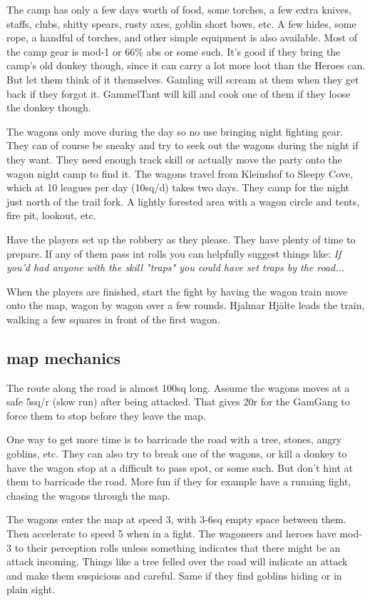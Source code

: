 The camp has only a few days worth of food, some torches, a few extra knives, staffs, clubs, shitty spears, rusty axes, goblin short bows, etc. A few hides, some rope, a handful of torches, and other simple equipment is also available. Most of the camp gear is mod-1 or 66\% abs or some such. It's good if they bring the camp's old donkey though, since it can carry a lot more loot than the Heroes can. But let them think of it themselves. Gamling will scream at them when they get back if they forgot it. GammelTant will kill and cook one of them if they loose the donkey though.

The wagons only move during the day so no use bringing night fighting gear. They can of course be sneaky and try to seek out the wagons during the night if they want. They need enough track skill or actually move the party onto the wagon night camp to find it. The wagons travel from Kleinshof to Sleepy Cove, which at 10 leagues per day (10sq/d) takes two days. They camp for the night just north of the trail fork. A lightly forested area with a wagon circle and tents, fire pit, lookout, etc.

Have the players set up the robbery as they please. They have plenty of time to prepare. If any of them pass int rolls you can helpfully suggest things like: \emph{If you'd had anyone with the skill "traps" you could have set traps by the road...}

When the players are finished, start the fight by having the wagon train move onto the map, wagon by wagon over a few rounds. Hjalmar Hjälte leads the train, walking a few squares in front of the first wagon.


\subsection*{map mechanics}

The route along the road is almost 100sq long. Assume the wagons moves at a safe 5sq/r (slow run) after being attacked. That gives 20r for the GamGang to force them to stop before they leave the map.

One way to get more time is to barricade the road with a tree, stones, angry goblins, etc. They can also try to break one of the wagons, or kill a donkey to have the wagon stop at a difficult to pass spot, or some such. But don't hint at them to barricade the road. More fun if they for example have a running fight, chasing the wagons through the map.

The wagons enter the map at speed 3, with 3-6sq empty space between them. Then accelerate to speed 5 when in a fight. The wagoneers and heroes have mod-3 to their perception rolls unless something indicates that there might be an attack incoming. Things like a tree felled over the road will indicate an attack and make them suspicious and careful. Same if they find goblins hiding or in plain sight.

